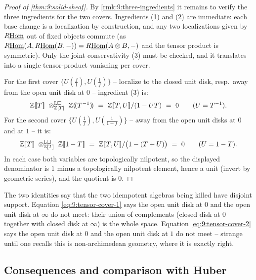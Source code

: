 \begin{proof}[Proof of \cref{thm:9:solid-sheaf}]
By \cref{rmk:9:three-ingredients} it remains to verify the three ingredients for
the two covers. Ingredients (1) and (2) are immediate: each base change is a
localization by construction, and any two localizations given by $R\underline{\operatorname{Hom}}$ out of
fixed objects commute (as $R\underline{\operatorname{Hom}}(A,R\underline{\operatorname{Hom}}(B,-))=R\underline{\operatorname{Hom}}(A\otimes B,-)$ and the
tensor product is symmetric). Only the joint conservativity (3) must be checked,
and it translates into a single tensor-product vanishing per cover.

For the first cover $\{U(\tfrac f1),U(\tfrac1f)\}$ -- localize to the closed
unit disk, resp.\ away from the open unit disk at $0$ -- ingredient (3) is:
\begin{equation}
\label{eq:9:tensor-cover-1}
\mathbb{Z}[\![T]\!]\ \otimes^{\mathbb{L}\square}_{\mathbb{Z}[T]}\
\mathbb{Z}(\!(T^{-1})\!)\ =\ \mathbb{Z}[\![T,U]\!]/(1-UT)\ =\ 0
\qquad(U=T^{-1}).
\end{equation}
For the second cover $\{U(\tfrac1f),U(\tfrac1{1-f})\}$ -- away from the open
unit disks at $0$ and at $1$ -- it is:
\begin{equation}
\label{eq:9:tensor-cover-2}
\mathbb{Z}[\![T]\!]\ \otimes^{\mathbb{L}\solid}_{\mathbb{Z}[T]}\
\mathbb{Z}[\![1-T]\!]\ =\ \mathbb{Z}[\![T,U]\!]/\bigl(1-(T+U)\bigr)\ =\ 0
\qquad(U=1-T).
\end{equation}
In each case both variables are topologically nilpotent, so the displayed
denominator is $1$ minus a topologically nilpotent element, hence a unit (invert
by geometric series), and the quotient is $0$.
\end{proof}

\begin{remark}
\label{rmk:9:disjoint-disks}
\ts{01:30:37}
The two identities say that the two idempotent algebras being killed have
disjoint support. Equation \eqref{eq:9:tensor-cover-1} says the open unit disk at
$0$ and the open unit disk at $\infty$ do not meet: their union of complements
(closed disk at $0$ together with closed disk at $\infty$) is the whole space.
Equation \eqref{eq:9:tensor-cover-2} says the open unit disk at $0$ and the open
unit disk at $1$ do not meet -- strange until one recalls this is
non-archimedean geometry, where it is exactly right.
\end{remark}

\subsection{Consequences and comparison with Huber}

